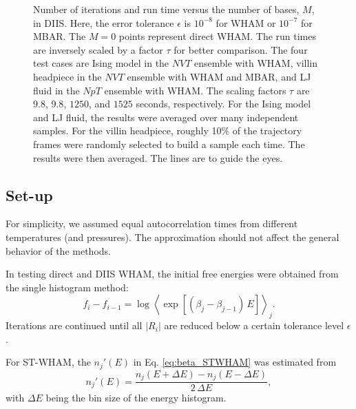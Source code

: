 \documentclass[reprint,aip,jcp,superscriptaddress]{revtex4-1}
\begin{document}
\begin{figure}[h]
  \caption{
    \label{fig:nsnt}
    Number of iterations
    and run time
    versus the number of bases, $M$,
    in DIIS.
    Here, the error tolerance
    $\epsilon$ is $10^{-8}$ for WHAM
    or $10^{-7}$ for MBAR.
    The $M = 0$ points represent direct WHAM.
    The run times are inversely scaled
    by a factor $\tau$
    for better comparison.
    The four test cases are
    Ising model in the $NVT$ ensemble with WHAM,
    villin headpiece in the $NVT$ ensemble with WHAM and MBAR,
    and
    LJ fluid in the $NpT$ ensemble with WHAM.
    The scaling factors $\tau$ are
    {\color{red} $9.8$, $9.8$, $1250$, and $1525$} seconds,
    respectively.
    For the Ising model and LJ fluid,
    the results were averaged
    over many independent samples.
    For the villin headpiece,
    roughly 10\% of the trajectory frames
    were randomly selected
    to build a sample each time.
    The results were then averaged.
    The lines are to guide the eyes.
  }
\end{figure}





\subsection{\label{sec:results_setup}
Set-up}



For simplicity,
we assumed equal autocorrelation times
from different temperatures (and pressures).
%
The approximation should not affect
the general behavior of the methods.



In testing direct and DIIS WHAM,
the initial free energies were obtained from
the single histogram method:
%
\begin{equation*}
f_i - f_{i-1}
=
\log
\left\langle
  \exp\left[
    (\beta_j - \beta_{j-1}) \, E
  \right]
\right\rangle_j.
\end{equation*}
%
Iterations are continued
until all $|R_i|$ are reduced
below a certain tolerance level $\epsilon$.



For ST-WHAM,
the $n_j'(E)$ in Eq. \eqref{eq:beta_STWHAM}
was estimated from
\begin{equation}
n_j'(E)
=
\frac{ n_j(E + \Delta E) - n_j(E - \Delta E) }
     { 2 \, \Delta E },
\label{eq:dn}
\end{equation}
with $\Delta E$ being the bin size
of the energy histogram.
\end{document}
